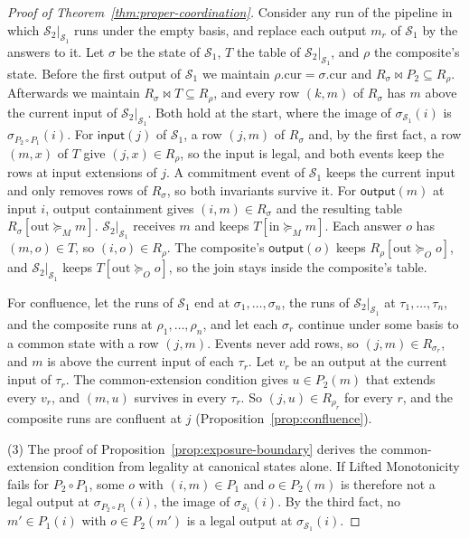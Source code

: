\documentclass[sigconf]{cidr-2027}
\theoremstyle{remark}
\newcommand{\OutputGe}{\succeq_O}
\newcommand{\commitment}{commitment\xspace}
\newcommand{\indescs}{input extensions\xspace}
\newcommand{\outrel}{extends\xspace}          %
\newcommand{\Spec}{\mathcal{S}}
\begin{document}
\begin{proof}[Proof of Theorem~\ref{thm:proper-coordination}]
\color{blue!70!black}Consider any run of the pipeline in which $\Spec_2|_{\Spec_1}$ runs under the
empty basis, and replace each output $m_r$ of $\Spec_1$ by the answers to it.
Let $\sigma$ be the state of $\Spec_1$, $T$ the table of
$\Spec_2|_{\Spec_1}$, and $\rho$ the composite's state.  Before the first
output of $\Spec_1$ we maintain $\rho.\mathrm{cur}=\sigma.\mathrm{cur}$ and
$R_\sigma\Join P_2\subseteq R_\rho$.  Afterwards we maintain $R_\sigma\Join
T\subseteq R_\rho$, and every row $(k,m)$ of $R_\sigma$ has $m$ above the
current input of $\Spec_2|_{\Spec_1}$.  Both hold at the start, where the
image of $\sigma_{\Spec_1}(i)$ is $\sigma_{P_2\circ P_1}(i)$.  For
$\mathsf{input}(j)$ of $\Spec_1$, a row $(j,m)$ of $R_\sigma$ and, by the first
fact, a row $(m,x)$ of $T$ give $(j,x)\in R_\rho$, so the input is legal, and
both events keep the rows at \indescs of $j$.  A \commitment event of
$\Spec_1$ keeps the current input and only removes rows of $R_\sigma$, so both
invariants survive it.  For $\mathsf{output}(m)$ at input $i$, output
containment gives $(i,m)\in R_\sigma$ and the resulting table
$R_\sigma[\mathrm{out}\succeq_M m]$.  $\Spec_2|_{\Spec_1}$ receives $m$
and keeps $T[\mathrm{in}\succeq_M m]$.  Each answer $o$ has $(m,o)\in T$, so
$(i,o)\in R_\rho$.  The composite's $\mathsf{output}(o)$ keeps
$R_\rho[\mathrm{out}\OutputGe o]$, and $\Spec_2|_{\Spec_1}$ keeps
$T[\mathrm{out}\OutputGe o]$, so the join stays inside the composite's table.\color{black}

For confluence, let the runs of $\Spec_1$ end at
$\sigma_1,\ldots,\sigma_n$, the runs of $\Spec_2|_{\Spec_1}$ at
$\tau_1,\ldots,\tau_n$, and the composite runs at $\rho_1,\ldots,\rho_n$, and
let each $\sigma_r$ continue under some basis to a common state with a row
$(j,m)$.  Events never add rows, so $(j,m)\in R_{\sigma_r}$, and $m$ is above
the current input of each $\tau_r$.  Let $v_r$ be an output at the current
input of $\tau_r$.  The common-extension condition gives $u\in P_2(m)$ that
\outrel every $v_r$, and $(m,u)$ survives in every $\tau_r$.  So $(j,u)\in
R_{\rho_r}$ for every $r$, and the composite runs are confluent at $j$
(Proposition~\ref{prop:confluence}).

(3) The proof of Proposition~\ref{prop:exposure-boundary} derives the
common-extension condition from legality at canonical states alone.  If
Lifted Monotonicity fails for $P_2\circ P_1$, some $o$ with $(i,m)\in P_1$ and
$o\in P_2(m)$ is therefore not a legal output at $\sigma_{P_2\circ P_1}(i)$, the
image of $\sigma_{\Spec_1}(i)$.  By the third fact, no $m'\in P_1(i)$ with
$o\in P_2(m')$ is a legal output at $\sigma_{\Spec_1}(i)$.
\end{proof}
\end{document}
